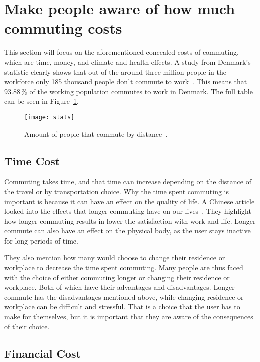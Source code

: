 \section{Make people aware of how much commuting costs}
\label{sec:make-people-aware-of-how-much-money-time-climate-they-are-using-on-commuting}

This section will focus on the aforementioned concealed costs of commuting, which are time, money, and climate and
health effects.
A study from Denmark’s statistic clearly shows that out of the around three million people in the workforce only
185 thousand people don't commute to work~\cite{erhvervspendling2021}.
This means that \(93.88\,\%\) of the working population commutes to work in Denmark.
The full table can be seen in Figure~\ref{fig:dst-commute}.

\begin{figure}
    \centering
    \texttt{[image: stats]}
    \caption{Amount of people that commute by distance~\cite{erhvervspendling2021}.}
    \label{fig:dst-commute}
\end{figure}

\subsection{Time Cost}\label{subsec:time-cost}

Commuting takes time, and that time can increase depending on the distance of the travel or by transportation choice.
Why the time spent commuting is important is because it can have an effect on the quality of life.
A Chinese article looked into the effects that longer commuting have on our lives~\cite{commuting-time2022}.
They highlight how longer commuting results in lower the satisfaction with work and life.
Longer commute can also have an effect on the physical body, as the user stays inactive for long periods of time.

They also mention how many would choose to change their residence or workplace to decrease the time spent commuting.
Many people are thus faced with the choice of either commuting longer or changing their residence or workplace.
Both of which have their advantages and disadvantages.
Longer commute has the disadvantages mentioned above, while changing residence or workplace can be difficult and
stressful.
That is a choice that the user has to make for themselves, but it is important that they are aware of the consequences
of their choice.

\subsection{Financial Cost}\label{subsec:financial-cost}

